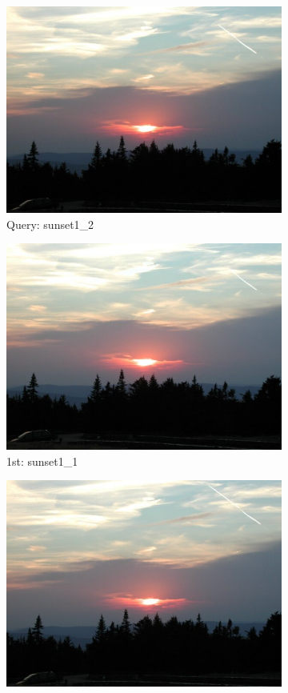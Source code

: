 \begin{itemize}
\begin{figure}[H]
	\centering
	\begin{subfigure}{0.25\textwidth}
	  \centering
	  \includegraphics[width=0.9\linewidth]{../input/sunset1_2.jpg}
	  \caption{Query: sunset1\_2}
	\end{subfigure}%
	\begin{subfigure}{0.25\textwidth}
	  \centering
	  \includegraphics[width=0.9\linewidth]{../input/sunset1_1.jpg}
	  \caption{1st: sunset1\_1}
	\end{subfigure}%
	\begin{subfigure}{0.25\textwidth}
        \centering
        \includegraphics[width=0.9\linewidth]{../input/sunset1_3.jpg}

\end{subfigure}
\end{figure}
\end{itemize}

